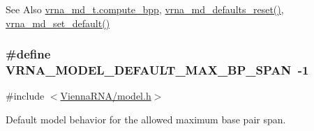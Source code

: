 \begin{DoxySeeAlso}{See Also}
\hyperlink{group__model__details_aa0c3e03d9064363e27adcc92b8d0380f}{vrna\-\_\-md\-\_\-t.\-compute\-\_\-bpp}, \hyperlink{group__model__details_ga70834424cf804d149937de89f80ceb45}{vrna\-\_\-md\-\_\-defaults\-\_\-reset()}, \hyperlink{group__model__details_ga8ac6ff84936282436f822644bf841f66}{vrna\-\_\-md\-\_\-set\-\_\-default()} 
\end{DoxySeeAlso}
\hypertarget{group__model__details_ga7cb6f4ae8fdebff6746a4410814f2977}{
\subsubsection[{V\-R\-N\-A\-\_\-\-M\-O\-D\-E\-L\-\_\-\-D\-E\-F\-A\-U\-L\-T\-\_\-\-M\-A\-X\-\_\-\-B\-P\-\_\-\-S\-P\-A\-N}]{\setlength{\rightskip}{0pt plus 5cm}\#define V\-R\-N\-A\-\_\-\-M\-O\-D\-E\-L\-\_\-\-D\-E\-F\-A\-U\-L\-T\-\_\-\-M\-A\-X\-\_\-\-B\-P\-\_\-\-S\-P\-A\-N~-\/1}}\label{group__model__details_ga7cb6f4ae8fdebff6746a4410814f2977}


{\ttfamily \#include $<$\hyperlink{model_8h}{Vienna\-R\-N\-A/model.\-h}$>$}



Default model behavior for the allowed maximum base pair span. 

